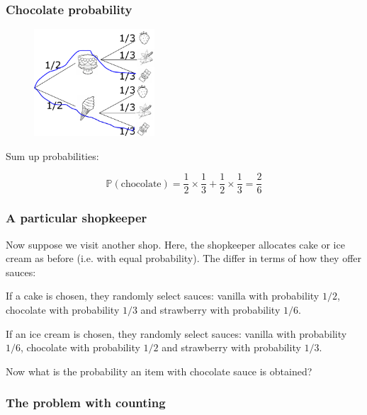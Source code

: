 \documentclass{beamer}
\begin{document}
	\begin{frame}
		\frametitle{Chocolate probability}
		
		\begin{figure}[ht]
			\centerline{\includegraphics[width=0.4\textwidth]{./figures/tree-prob-choc.pdf}}
		\end{figure}
	
	Sum up probabilities:
	
	\begin{equation}
		\mathbb{P}(\text{chocolate}) = \frac{1}{2} \times \frac{1}{3} +  \frac{1}{2} \times \frac{1}{3} = \frac{2}{6}
	\end{equation}
	
	\end{frame}

	\begin{frame}
		\frametitle{A particular shopkeeper}
		Now suppose we visit another shop. Here, the shopkeeper allocates cake or ice cream as before (i.e. with equal probability). The differ in terms of how they offer sauces:
		
		\vspace{0.5cm}
		
		If a cake is chosen, they randomly select sauces: vanilla with probability $1/2$, chocolate with probability $1/3$ and strawberry with probability $1/6$.
		
		\vspace{0.5cm}
		
		If an ice cream is chosen, they randomly select sauces: vanilla with probability $1/6$, chocolate with probability $1/2$ and strawberry with probability $1/3$.
		
		\vspace{0.5cm}
		
		Now what is the probability an item with chocolate sauce is obtained?
		
	\end{frame}

	\begin{frame}
		\frametitle{The problem with counting}
		
		
		
	\end{frame}
\end{document}
